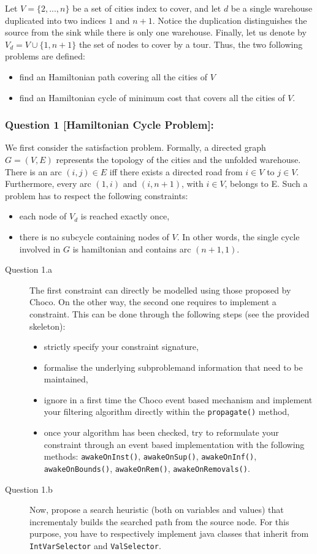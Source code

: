 Let $V = \{2,...,n\}$ be a set of cities index to cover, and let $d$ be a single warehouse duplicated into two indices $1$ and $n+1$. Notice the duplication distinguishes the source from the sink while there is only one warehouse. Finally, let us denote by $V_{d} = V \cup \{1,n+1\}$ the set of nodes to cover by a tour. Thus, the two following problems are defined:
\begin{itemize}
	\item find an Hamiltonian path covering all the cities of $V$
	\item find an Hamiltonian cycle of minimum cost that covers all the cities of $V$.
\end{itemize}

\subsubsection{Question 1 [Hamiltonian Cycle Problem]:} We first consider the satisfaction problem. Formally, a directed graph $G = (V,E)$ represents the topology of the cities and the unfolded warehouse. There is an arc $(i,j)\in E$ iff there exists a directed road from $i\in V$ to $j\in V$. Furthermore, every arc $(1,i)$ and $(i,n+1)$, with $i\in V$, belongs to E. Such a problem has to respect the following constraints:
\begin{itemize}
	\item each node of $V_{d}$ is reached exactly once,
	\item there is no subcycle containing nodes of $V$. In other words, the single cycle involved in $G$ is hamiltonian and contains arc $(n+1,1)$.
\end{itemize}
\begin{description}
\item[Question 1.a] The first constraint can directly be modelled using those proposed by Choco. On the other way, the second one requires to implement a constraint. This can be done through the following steps (see the provided skeleton):
\begin{itemize}
	\item strictly specify your constraint signature,
	\item formalise the underlying subproblemand information that need to be maintained,
	\item ignore in a first time the Choco event based mechanism and implement your filtering algorithm directly within the \texttt{propagate()} method,
	\item once your algorithm has been checked, try to reformulate your constraint through an event based implementation with the following methods: \texttt{awakeOnInst()}, \texttt{awakeOnSup()}, \texttt{awakeOnInf()}, \texttt{awakeOnBounds()}, \texttt{awakeOnRem()}, \texttt{awakeOnRemovals()}.
\end{itemize}
\item[Question 1.b] Now, propose a search heuristic (both on variables and values) that incrementaly builds the searched path from the source node. For this purpose, you have to respectively implement java classes that inherit from \texttt{IntVarSelector} and \texttt{ValSelector}.
\end{description}

